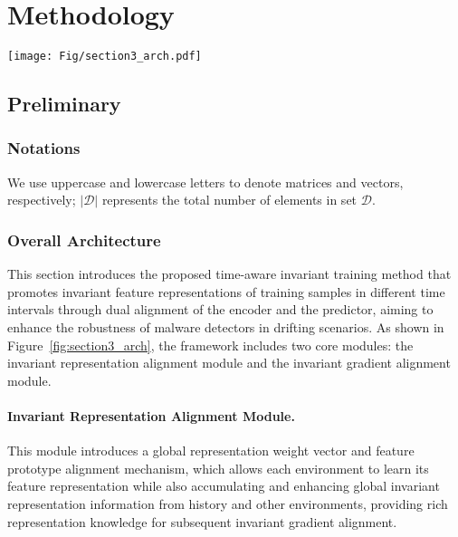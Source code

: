 \section{Methodology}



\begin{figure*}
    \centering
    \setlength{\abovecaptionskip}{0.cm}
    \texttt{[image: Fig/section3\_arch.pdf]}
    \caption{The Overview of Proposed Temporal Invariant Training}
    \label{fig:section3_arch}
\end{figure*}


\subsection{Preliminary}
\subsubsection{Notations}
We use uppercase and lowercase letters to denote matrices and vectors, respectively; $|\mathcal{D}|$ represents the total number of elements in set $\mathcal{D}$. 

\subsubsection{Overall Architecture}
This section introduces the proposed time-aware invariant training method that promotes invariant feature representations of training samples in different time intervals through dual alignment of the encoder and the predictor, aiming to enhance the robustness of malware detectors in drifting scenarios. As shown in Figure~\ref{fig:section3_arch}, the framework includes two core modules: the invariant representation alignment module and the invariant gradient alignment module.

\paragraph{Invariant Representation Alignment Module.} This module introduces a global representation weight vector and feature prototype alignment mechanism, which allows each environment to learn its feature representation while also accumulating and enhancing global invariant representation information from history and other environments, providing rich representation knowledge for subsequent invariant gradient alignment.

